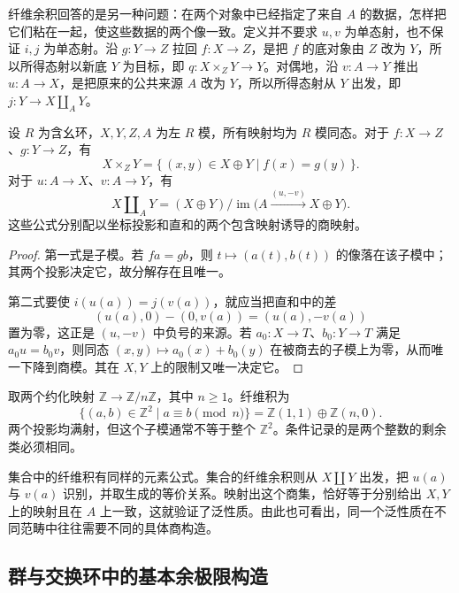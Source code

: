 纤维余积回答的是另一种问题：在两个对象中已经指定了来自 \(A\) 的数据，怎样把它们粘在一起，使这些数据的两个像一致。定义并不要求 \(u,v\) 为单态射，也不保证 \(i,j\) 为单态射。沿 \(g:Y\rightarrow Z\) 拉回 \(f:X\rightarrow Z\)，是把 \(f\) 的底对象由 \(Z\) 改为 \(Y\)，所以所得态射以新底 \(Y\) 为目标，即 \(q:X\times_ZY\rightarrow Y\)。对偶地，沿 \(v:A\rightarrow Y\) 推出 \(u:A\rightarrow X\)，是把原来的公共来源 \(A\) 改为 \(Y\)，所以所得态射从 \(Y\) 出发，即 \(j:Y\rightarrow X\amalg_A Y\)。

\begin{proposition}[模的纤维积与纤维余积]\label{b4:prop:module-pullback-pushout}
	设 \(R\) 为含幺环，\(X,Y,Z,A\) 为左 \(R\) 模，所有映射均为 \(R\) 模同态。对于 \(f:X\rightarrow Z\)、\(g:Y\rightarrow Z\)，有
	\[
		X\times_ZY=\{\,(x,y)\in X\oplus Y\mid f(x)=g(y)\,\}.
	\]
	对于 \(u:A\rightarrow X\)、\(v:A\rightarrow Y\)，有
	\[
		X\amalg_A Y=(X\oplus Y)/ \operatorname{im}\bigl(A\xrightarrow{(u,-v)}X\oplus Y\bigr).
	\]
	这些公式分别配以坐标投影和直和的两个包含映射诱导的商映射。
\end{proposition}
\begin{proof}
	第一式是子模。若 \(fa=gb\)，则 \(t\mapsto(a(t),b(t))\) 的像落在该子模中；其两个投影决定它，故分解存在且唯一。

	第二式要使 \(i(u(a))=j(v(a))\)，就应当把直和中的差
	\[
		(u(a),0)-(0,v(a))=(u(a),-v(a))
	\]
	置为零，这正是 \((u,-v)\) 中负号的来源。若 \(a_0:X\rightarrow T\)、\(b_0:Y\rightarrow T\) 满足 \(a_0u=b_0v\)，则同态 \((x,y)\mapsto a_0(x)+b_0(y)\) 在被商去的子模上为零，从而唯一下降到商模。其在 \(X,Y\) 上的限制又唯一决定它。
\end{proof}

\begin{example}[由相同商黏合两个整数]\label{b4:exm:integer-pullback}
	取两个约化映射 \(\mathbb Z\rightarrow\mathbb Z/n\mathbb Z\)，其中 \(n\ge1\)。纤维积为
	\[
		\{(a,b)\in\mathbb Z^2\mid a\equiv b\pmod n\} =\mathbb Z(1,1)\oplus\mathbb Z(n,0).
	\]
	两个投影均满射，但这个子模通常不等于整个 \(\mathbb Z^2\)。条件记录的是两个整数的剩余类必须相同。
\end{example}

集合中的纤维积有同样的元素公式。集合的纤维余积则从 \(X\amalg Y\) 出发，把 \(u(a)\) 与 \(v(a)\) 识别，并取生成的等价关系。映射出这个商集，恰好等于分别给出 \(X,Y\) 上的映射且在 \(A\) 上一致，这就验证了泛性质。由此也可看出，同一个泛性质在不同范畴中往往需要不同的具体商构造。

\subsection{群与交换环中的基本余极限构造}
\label{b4:subsec:0201:03}


